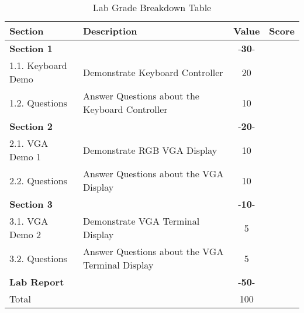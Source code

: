 \documentclass{article}
\begin{document}
\begin{table}[!htb]
  \begin{center}
    \begin{tabular}[width=0.8\textwidth]{|l|l|c|l|}
       \hline
       Section & Description & Value & Score\\
       \hline 
       \multicolumn{2}{|l}{\textbf{Section 1}}  & -\textbf{30}- &\\
       \hline
       1.1. Keyboard Demo & Demonstrate Keyboard Controller & 20 &\\
       1.2. Questions & Answer Questions about the Keyboard Controller & 10 &\\
       \hline
       \multicolumn{2}{|l}{\textbf{Section 2}}  & -\textbf{20}- &\\
       \hline
       2.1. VGA Demo 1 & Demonstrate RGB VGA Display & 10 &\\
       2.2. Questions & Answer Questions about the VGA Display & 10 &\\
       \hline
       \multicolumn{2}{|l}{\textbf{Section 3}}  & -\textbf{10}- &\\
       \hline
       3.1. VGA Demo 2 & Demonstrate VGA Terminal Display & 5 &\\
       3.2. Questions & Answer Questions about the VGA Terminal Display & 5 &\\
       \hline
       \multicolumn{2}{|l}{\textbf{Lab Report}}  & -\textbf{50}- &\\
       \hline
       \hline
       \multicolumn{2}{|l}{Total} & \multicolumn{1}{c|}{100} &\\
       \hline
    \end{tabular}
  \end{center}
  \caption{Lab Grade Breakdown Table}
\end{table}
\end{document}
